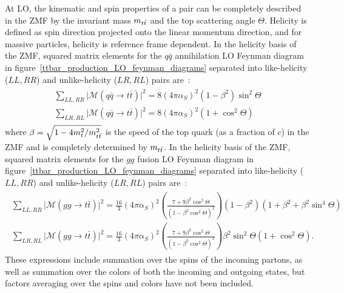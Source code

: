 At LO, the kinematic and spin properties of a \ttbar pair can be completely described in the \ttbar ZMF by the invariant mass $m_{t\bar{t}}$ and the top scattering angle $\Theta$.
Helicity is defined as spin direction projected onto the linear momentum direction, and for massive particles, helicity is reference frame dependent.
In the helicity basis of the \ttbar ZMF, squared matrix elements for the $q\bar{q}$ annihilation LO Feynman diagram in figure~\ref{ttbar_production_LO_feynman_diagrams} separated into like-helicity ($L L, R R$) and unlike-helicity ($L R, R L$) \ttbar pairs are~\cite{PhysRevD.53.4886}:
\begin{align}
\begin{array}{c}
\sum_{L L, R R}\vert\mathcal{M}(q \bar{q} \rightarrow t \bar{t})\vert^2=8 (4 \pi \alpha_S)^2 \left(1-\beta^2\right) \sin ^2 \Theta \\
\sum_{L R, R L}\vert\mathcal{M}(q \bar{q} \rightarrow t \bar{t})\vert^2=8 (4 \pi \alpha_S)^2 \left(1+\cos ^2 \Theta\right)
\end{array}
\label{qq_matrix_elements}
\end{align}
where $\beta=\sqrt{1-4 m_t^2 / m_{t\bar{t}}^2}$ is the speed of the top quark (as a fraction of $c$) in the \ttbar ZMF and is completely determined by $m_{t\bar{t}}$.
In the helicity basis of the \ttbar ZMF, squared matrix elements for the $gg$ fusion LO Feynman diagram in figure~\ref{ttbar_production_LO_feynman_diagrams} separated into like-helicity ($L L, R R$) and unlike-helicity ($L R, R L$) \ttbar pairs are~\cite{PhysRevD.53.4886}:
\begin{align}
\begin{array}{c}
\sum_{L L, R R}\vert\mathcal{M}(g g \rightarrow t \bar{t})\vert^2=\frac{16}{3} (4 \pi \alpha_S)^2 (\frac{7+9 \beta^2 \cos ^2 \Theta}{\left(1-\beta^2 \cos ^2 \Theta\right)^2}) \left(1-\beta^2\right)\left(1+\beta^2+\beta^2 \sin ^4 \Theta\right) \\
\sum_{L R, R L}\vert\mathcal{M}(g g \rightarrow t \bar{t})\vert^2=\frac{16}{3} (4 \pi \alpha_S)^2 (\frac{7+9 \beta^2 \cos ^2 \Theta}{\left(1-\beta^2 \cos ^2 \Theta\right)^2}) \beta^2 \sin ^2 \Theta\left(1+\cos ^2 \Theta\right).
\end{array}
\label{gg_matrix_elements}
\end{align}
These expressions include summation over the spins of the incoming partons, as well as summation over the colors of both the incoming and outgoing states, but factors averaging over the spins and colors have not been included.

